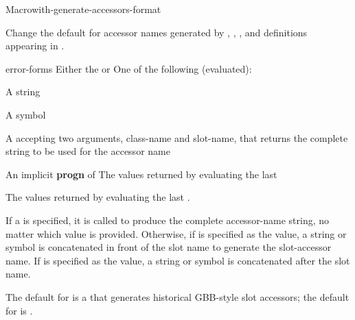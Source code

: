 \documentclass[10pt,twoside,english,pdftex]{article}
\begin{document}
\begin{functiondoc}{Macro}{with-generate-accessors-format}%
  {
    }

\fnsyntax

\fnpurpose Change the default for accessor names generated by
,
,
, and
 definitions appearing in
.

\fnpackage {}

\fnmodule {}

\fnargs
\begin{args}{error-forms}
\arg[format] Either the   or 
 One of the following (evaluated):
\begin{tightitemize}
\item A string 
\item A symbol
\item A  accepting two arguments, class-name and
  slot-name, that returns the complete string to be used for the accessor name
\end{tightitemize}
\arg[forms] An implicit \textbf{progn} of 
\arg[results] The values returned by evaluating the last 
\end{args}

\fnreturns The values returned by evaluating the last .

\fndescription If a  
is specified, it is called to produce the complete accessor-name string, no
matter which  value is provided.  Otherwise, if
 is specified as the  value, a string or
symbol  is concatenated in front of the slot
name to generate the slot-accessor name.  If  is
specified as the  value, a string or symbol
 is concatenated after the slot name.

The default  for  is a
 that generates historical GBB-style
 slot accessors; the
default for  is .


\end{functiondoc}
\end{document}
